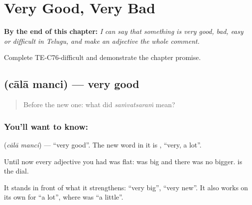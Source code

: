 
\chapter{Very Good, Very Bad}
\label{ch:te-very-good-very-bad}

\begin{chapteropening}
\textbf{By the end of this chapter:} \emph{I can say that something is very good, bad, easy or difficult in Telugu, and make an adjective the whole comment.}

Complete TE-C76-difficult and demonstrate the chapter promise.
\end{chapteropening}

\section[\texorpdfstring{\te{చాలా} \te{మంచి} (cālā manci)}{చాలా మంచి (cālā manci)}]{  (cālā manci) — very good}

\label{lesson:TE-C76-very}



\begin{quote}
Before the new one: what did \emph{saṁvatsaraṁ} mean?
\end{quote}

\subsection*{You'll want to know:  }
\textbf{ } (\emph{cālā manci}) — \textquotedblleft{}very good\textquotedblright{}. The new word in it is \textbf{}, \textquotedblleft{}very, a lot\textquotedblright{}.

Until now every adjective you had was flat:  was big and there was no bigger.  is the dial.

It stands in front of what it strengthens: \textbf{ } \textquotedblleft{}very big\textquotedblright{}, \textbf{ } \textquotedblleft{}very new\textquotedblright{}. It also works on its own for \textquotedblleft{}a lot\textquotedblright{}, where  was \textquotedblleft{}a little\textquotedblright{}.

